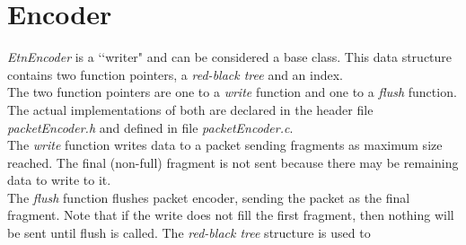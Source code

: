 \section*{Encoder}
\emph{EtnEncoder} is a \lq\lq writer" and can be considered a base class. This data structure contains two function pointers, a \emph{red-black tree} and an index.\\
The two function pointers are one to a \emph{write} function and one to a \emph{flush} function. The actual implementations of both are declared in the header file \emph{packetEncoder.h} and defined in file \emph{packetEncoder.c}.\\
The \emph{write} function  writes data to a packet sending fragments as maximum size reached. The final (non-full) fragment is not sent because there may be remaining data to write to it.\\
The \emph{flush} function flushes packet encoder, sending the packet as the final fragment. Note that if the write does not fill the first fragment, then nothing will be sent until flush is called.
The \emph{red-black tree} structure is used to 























\begin{comment}
// The parent encoder class.
typedef struct EtnEncoder_s {
	int (*write)(struct EtnEncoder_s *e, uint8_t *data, EtnLength length);
	void (*flush)(struct EtnEncoder_s *e);
	void *topLevelPointer; // See comments in encoder.c.
	struct rbtree addrToIndex;
	EtnLength index;
} EtnEncoder;

// Encoder subclass that encodes to provided memory range.
typedef struct EtnBufferEncoder_s {
	EtnEncoder encoder;
	uint8_t *dataCurrent;
	uint8_t *dataEnd;
} EtnBufferEncoder;

// Encoder subclass that throws away encoded data;
// useful to determine what size of encoded data will be.
typedef struct EtnNullEncoder_s {
	EtnEncoder encoder;
} EtnNullEncoder;
\end{comment}
